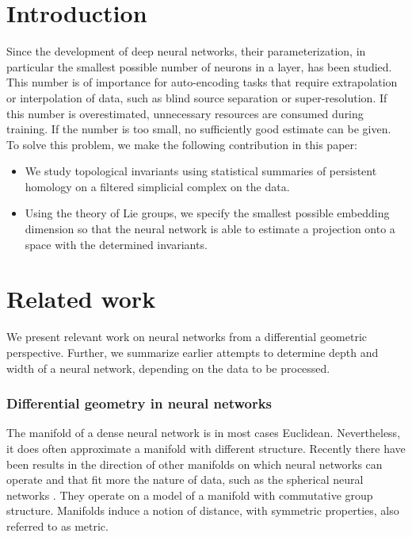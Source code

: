 \documentclass[runningheads,orivec]{llncs}
\begin{document}
\section{Introduction}
Since the development of deep neural networks, their parameterization, in particular the smallest possible number of neurons in a layer, has been studied. This number is of importance for auto-encoding tasks that require extrapolation or interpolation of data, such as blind source separation or super-resolution. If this number is overestimated, unnecessary resources are consumed during training. If the number is too small, no sufficiently good estimate can be given. To solve this problem, we make the following contribution in this paper:
\begin{itemize}
    \item We study topological invariants using statistical summaries of persistent homology on a filtered simplicial complex on the data.
    \item Using the theory of Lie groups, we specify the smallest possible embedding dimension so that the neural network is able to estimate a projection onto a space with the determined invariants.
\end{itemize}

\section{Related work}
We present relevant work on neural networks from a differential geometric perspective. Further, we summarize earlier attempts to determine depth and width of a neural network, depending on the data to be processed.

\subsubsection*{Differential geometry in neural networks} The manifold of a dense neural network is in most cases Euclidean. Nevertheless, it does often approximate a manifold with different structure. Recently there have been results in the direction of other manifolds on which neural networks can operate and that fit more the nature of data, such as the spherical neural networks \cite{CohenGKW18}. They operate on a model of a manifold with commutative group structure. Manifolds induce a notion of distance, with symmetric properties, also referred to as metric.
\end{document}
